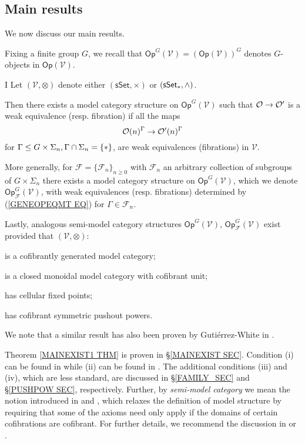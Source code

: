 \documentclass[a4paper,10pt]{article}%
\begin{document}
\subsection{Main results}

We now discuss our main results.

Fixing a finite group $G$, we
recall that 
$\mathsf{Op}^G(\mathcal{V})
=
\left(\mathsf{Op}(\mathcal{V})\right)^G$
denotes $G$-objects in 
$\mathsf{Op}(\mathcal{V})$.

\begin{customthm}{I}\label{MAINEXIST1 THM}
Let $(\mathcal{V},\otimes)$
denote either 
$(\mathsf{sSet}, \times)$
or
$(\mathsf{sSet}_{\**}, \wedge)$.

Then there exists a model category structure on 
$\mathsf{Op}^G(\mathcal{V})$ such that 
$\mathcal{O} \to \mathcal{O}'$ is a weak equivalence (resp. fibration)
if all the maps
\begin{equation}\label{GENEOPEQMT EQ}
	\mathcal{O}(n)^{\Gamma} \to \mathcal{O}'(n)^{\Gamma}
\end{equation}
for 
$\Gamma \leq G\times \Sigma_n, \Gamma \cap \Sigma_n = \{\**\}$, 
are weak equivalences (fibrations) in $\mathcal{V}$.

More generally, for $\mathcal{F} = \{\mathcal{F}_n\}_{n \geq 0}$ with $\mathcal{F}_n$ an arbitrary collection of subgroups of $G \times \Sigma_n$ there exists a model category structure on 
$\mathsf{Op}^G(\mathcal{V})$,
which we denote
$\mathsf{Op}^G_{\mathcal{F}}(\mathcal{V})$,
with weak equivalences (resp. fibrations)
determined by (\ref{GENEOPEQMT EQ}) for $\Gamma \in \mathcal{F}_n$.

Lastly, 
analogous 
semi-model category structures
$\mathsf{Op}^G(\mathcal{V})$,
$\mathsf{Op}^G_{\mathcal{F}}(\mathcal{V})$
exist
provided that
$(\mathcal{V},\otimes)$:
\begin{inparaenum}
\item[(i)] is a cofibrantly generated model category;
\item [(ii)] is a closed monoidal model category with cofibrant unit;
\item[(iii)] has cellular fixed points;
\item[(iv)] has cofibrant symmetric pushout powers.
\end{inparaenum}
\end{customthm}

We note that a similar result has also been proven by Guti\'{e}rrez-White in \cite{GW17}.

Theorem \ref{MAINEXIST1 THM}
is proven in \S \ref{MAINEXIST SEC}.
Condition (i) can be found in 
\cite[Def. 2.1.17]{Ho98} while (ii) 
can be found in \cite[Def. 4.2.6]{Ho98}.
The additional conditions (iii) and (iv),
which are less standard, are discussed in 
\S \ref{FAMILY_SEC} and
\S \ref{PUSHPOW SEC}, respectively.
Further, by \textit{semi-model category}
we mean the notion introduced in 
\cite{Ho98} and \cite{Spi01}, 
which relaxes the definition of model structure by requiring that some of the axioms need only apply
if the domains of certain cofibrations are cofibrant. For further details, we recommend the discussion in \cite[\S 2.2]{WY15} or \cite[\S 12.1]{Fre09}.
\end{document}
